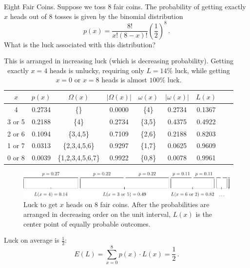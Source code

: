 \begin{example}{Eight Fair Coins.}
Suppose we toss 8 fair coins.  The probability of getting exactly $x$ heads out of 8 tosses is given by the binomial distribution
\begin{equation}
p(x)=\frac{8!}{x!(8-x)!}\left(\frac{1}{2}\right)^8 \,.
\end{equation}
What is the luck associated with this distribution?
\begin{table}
\caption{This is arranged in increasing luck (which is decreasing probability). Getting exactly $x=4$ heads is unlucky, requiring only $L=14\%$ luck, while getting $x=0$ or $x=8$ heads is almost $100\%$ luck.}
\begin{tabular}{|c|S[table-format=2.4]|c|S[table-format=2.4]|c|S[table-format=2.4]|c|S[table-format=2.4]|S[table-format=2.4]|}
 &
 &
 &
 &
 &
 &
 \\
 & 0.2734 &  \{\} & 0.0000 & \{4\} & 0.2734 & 0.1367 \\
3 or 5 & 0.2188 & \{4\} & 0.2734 & \{3,5\} & 0.4375 & 0.4922 \\
2 or 6 & 0.1094 & \{3,4,5\} & 0.7109 & \{2,6\} & 0.2188 & 0.8203 \\
1 or 7 & 0.0313 & \{2,3,4,5,6\} & 0.9297 & \{1,7\} & 0.0625 & 0.9609 \\
0 or 8 & 0.0039 & \{1,2,3,4,5,6,7\} & 0.9922 & \{0,8\} & 0.0078 & 0.9961 \\
\hline
\end{tabular}
\end{table}
\begin{figure}
\begin{center}
\includegraphics[width=1.00\linewidth]{graphics/arrange.pdf}
\end{center}
\caption{\label{fig:arrange}Luck to get $x$ heads on $8$ fair coins.  After the probabilities are arranged in decreasing order on the unit interval, $L(x)$ is the center point of equally probable outcomes.}
\label{fig:arrange}
\end{figure}

Luck on average is $\frac{1}{2}$:
\begin{equation}
E(L)=\sum_{x=0}^8 p(x) \cdot L(x) = \frac{1}{2} \,.
\end{equation}


\end{example}
